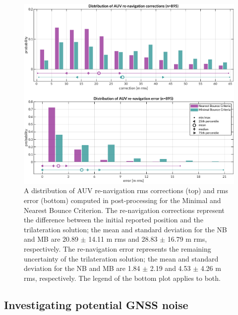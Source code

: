 \documentclass[preprint,TurnOnLineNumbers]{JASA}
\newcommand{\llabel}[1]{\hypertarget{llineno:#1}{\linelabel{#1}}}
\begin{document}
\begin{figure}[!ht]
\includegraphics[width=\textwidth]{Fig12.pdf}
\caption{A distribution of AUV re-navigation rms corrections (top) and rms error (bottom) computed in post-processing for the Minimal and Nearest Bounce Criterion. The re-navigation corrections represent the difference between the initial reported position and the trilateration solution; the mean and standard deviation for the NB and MB are 20.89 $\pm$ 14.11 m rms and 28.83 $\pm$ 16.79 m rms, respectively. The re-navigation error represents the remaining uncertainty of the trilateration solution; the mean and standard deviation for the NB and MB are 1.84 $\pm$ 2.19 and 4.53 $\pm$ 4.26 m rms, respectively. The legend of the bottom plot applies to both.}
\label{fig:trilat-auv}
\end{figure}

\subsection{Investigating potential GNSS noise}
\llabel{1.7}
\end{document}
